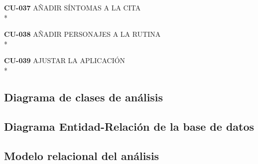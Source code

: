 \documentclass[../pfc.tex]{subfiles}
\begin{document}
	\textbf{CU-037}	AÑADIR SÍNTOMAS A LA CITA\\*

	\textbf{CU-038}	AÑADIR PERSONAJES A LA RUTINA\\*
	
	\textbf{CU-039}	AJUSTAR LA APLICACIÓN\\*



		
	\subsection{Diagrama de clases de análisis}
		
	\subsection{Diagrama Entidad-Relación de la base de datos}
		
	\subsection{Modelo relacional del análisis}
	
\end{document}
